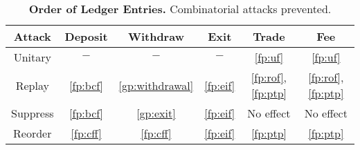 \documentclass[12pt,a4paper]{article}
\begin{document}
\begin{table}[ht]
\caption{\textbf{Order of Ledger Entries.} Combinatorial attacks prevented.}
\centering
\begin{tabular}{|c|c|c|c|c|c|}
\hline
        \bfseries Attack &\bfseries Deposit  & \bfseries Withdraw & \bfseries Exit & \bfseries Trade & \bfseries Fee \\
\hline

\rowcolor{yellow!50} Unitary  & $-$  & $-$  & $-$  & \ref{fp:uf}  & \ref{fp:uf} \\
\rowcolor{yellow!50} Replay  & \ref{fp:bcf}  & \ref{gp:withdrawal} & \ref{fp:eif}   & \ref{fp:rof}, \ref{fp:ptp}  & \ref{fp:rof}, \ref{fp:ptp} \\
\rowcolor{yellow!50} Suppress  &   \ref{fp:bcf}  & \ref{gp:exit} & \ref{fp:eif}   &  No effect\footnotemark & No effect \\
\rowcolor{yellow!50} Reorder  & \ref{fp:cff}   & \ref{fp:cff} & \ref{fp:eif}   & \ref{fp:ptp}  & \ref{fp:ptp} \\
\hline
\end{tabular}
\end{table}
\newpage
\centering

\end{document}
